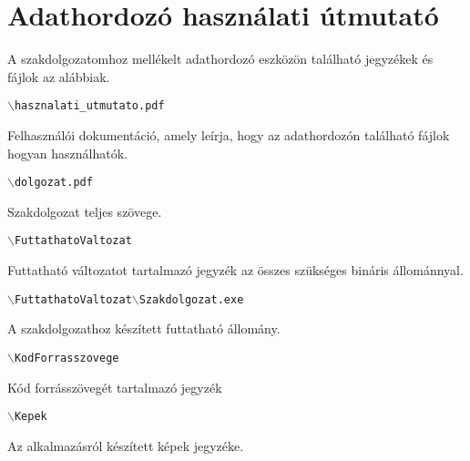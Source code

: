 \chapter*{Adathordozó használati útmutató}



\noindent A szakdolgozatomhoz mellékelt adathordozó eszközön található jegyzékek és fájlok az alábbiak.

\bigskip

\noindent \texttt{$\backslash$hasznalati\_utmutato.pdf}

\medskip

Felhasználói dokumentáció, amely leírja, hogy az adathordozón található fájlok hogyan használhatók.

\bigskip

\noindent \texttt{$\backslash$dolgozat.pdf}

\medskip

Szakdolgozat teljes szövege.

\bigskip

\noindent \texttt{$\backslash$FuttathatoValtozat}

\medskip

Futtatható változatot tartalmazó jegyzék az összes szükséges bináris állománnyal.

\bigskip

\noindent \texttt{$\backslash$FuttathatoValtozat$\backslash$Szakdolgozat.exe}

\medskip

A szakdolgozathoz készített futtatható állomány.

\bigskip

\noindent \texttt{$\backslash$KodForrasszovege}

\medskip

Kód forrásszövegét tartalmazó jegyzék

\bigskip

\noindent \texttt{$\backslash$Kepek}

\medskip

Az alkalmazásról készített képek jegyzéke.
